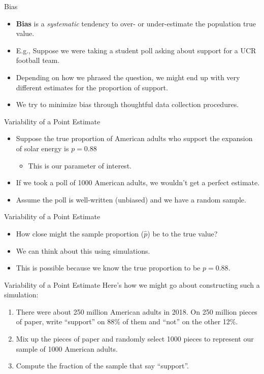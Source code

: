 \begin{frame}{Bias}
    \begin{itemize}
        \item \textbf{Bias} is a \textit{systematic} tendency to over- or under-estimate the population true value.
        \item E.g., Suppose we were taking a student poll asking about support for a UCR football team.
        \item Depending on how we phrased the question, we might end up with very different estimates for the proportion of support.
        \item We try to minimize bias through thoughtful data collection procedures.
    \end{itemize}
\end{frame}

\begin{frame}{Variability of a Point Estimate}
    \begin{itemize}
        \item Suppose the true proportion of American adults who support the expansion of solar energy is $p = 0.88$
        \begin{itemize}
            \item This is our parameter of interest.
        \end{itemize}
        \item If we took a poll of 1000 American adults, we wouldn't get a perfect estimate.
        \item Assume the poll is well-written (unbiased) and we have a random sample. 
    \end{itemize}
\end{frame}

\begin{frame}{Variability of a Point Estimate}
    \begin{itemize}
        \item How close might the sample proportion ($\hat{p}$) be to the true value?
        \item We can think about this using simulations. 
        \item This is possible because we know the true proportion to be $p=0.88$.
    \end{itemize}
\end{frame}

\begin{frame}{Variability of a Point Estimate}
    Here’s how we might go about constructing such a simulation:
    \begin{enumerate}
        \item There were about 250 million American adults in 2018. On 250 million pieces of paper, write “support” on 88\% of them and “not” on the other 12\%.
        \item Mix up the pieces of paper and randomly select 1000 pieces to represent our sample of 1000 American adults.
        \item Compute the fraction of the sample that say “support”.
    \end{enumerate}
\end{frame}

